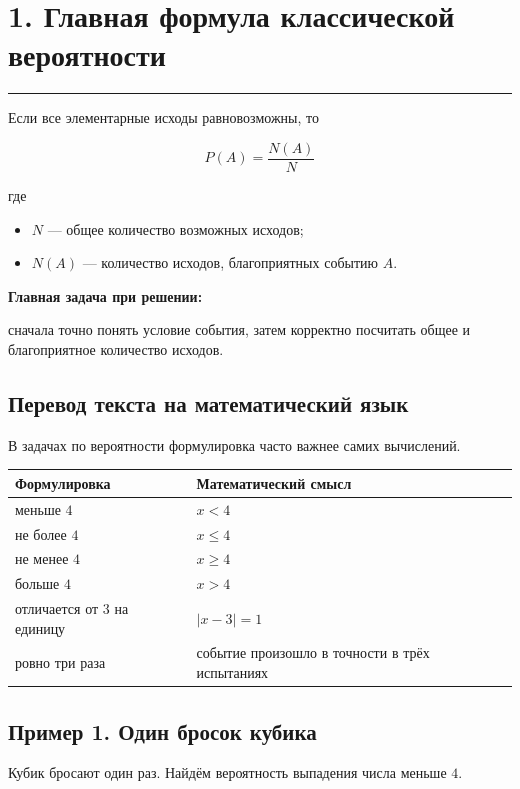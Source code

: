 \documentclass[a4paper,12pt]{article}
\newcommand{\sectionline}{%
    \vspace{0.2em}
    {\color{accent}\rule{\linewidth}{0.7pt}}
    \vspace{0.4em}
}
\newcommand{\important}[1]{%
    \par\smallskip
    {\color{darkaccent}\textbf{#1}}
    \par\smallskip
}
\begin{document}
\section*{1. Главная формула классической вероятности}
\sectionline

Если все элементарные исходы равновозможны, то

\[
\boxed{
P(A)=\frac{N(A)}{N}
}
\]

где

\begin{itemize}[leftmargin=1.5em]
    \item \(N\) --- общее количество возможных исходов;
    \item \(N(A)\) --- количество исходов, благоприятных событию \(A\).
\end{itemize}

\important{Главная задача при решении:}
сначала точно понять условие события, затем корректно посчитать общее и благоприятное количество исходов.

\subsection*{Перевод текста на математический язык}

В задачах по вероятности формулировка часто важнее самих вычислений.

\begin{center}
\renewcommand{\arraystretch}{1.3}
\begin{tabularx}{0.92\linewidth}{@{}lX@{}}
\toprule
Формулировка & Математический смысл \\
\midrule
меньше \(4\) & \(x<4\) \\
не более \(4\) & \(x\le 4\) \\
не менее \(4\) & \(x\ge 4\) \\
больше \(4\) & \(x>4\) \\
отличается от \(3\) на единицу & \(|x-3|=1\) \\
ровно три раза & событие произошло в точности в трёх испытаниях \\
\bottomrule
\end{tabularx}
\end{center}

\subsection*{Пример 1. Один бросок кубика}

Кубик бросают один раз. Найдём вероятность выпадения числа меньше \(4\).
\end{document}
